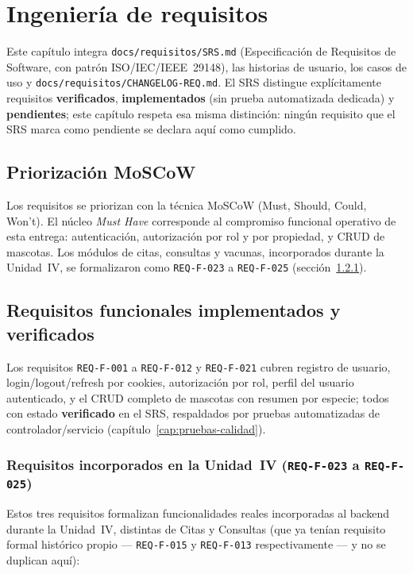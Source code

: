 \chapter{Ingenier\'ia de requisitos}
\label{cap:requisitos}

Este cap\'itulo integra \texttt{docs/requisitos/SRS.md} (Especificaci\'on
de Requisitos de Software, con patr\'on ISO/IEC/IEEE~29148), las historias
de usuario, los casos de uso y \texttt{docs/requisitos/CHANGELOG-REQ.md}.
El SRS distingue expl\'icitamente requisitos \textbf{verificados},
\textbf{implementados} (sin prueba automatizada dedicada) y
\textbf{pendientes}; este cap\'itulo respeta esa misma distinci\'on: ning\'un
requisito que el SRS marca como pendiente se declara aqu\'i como cumplido.

\section{Priorizaci\'on MoSCoW}

Los requisitos se priorizan con la t\'ecnica MoSCoW (Must, Should, Could,
Won't). El n\'ucleo \emph{Must Have} corresponde al compromiso funcional
operativo de esta entrega: autenticaci\'on, autorizaci\'on por rol y por
propiedad, y CRUD de mascotas. Los m\'odulos de citas, consultas y
vacunas, incorporados durante la Unidad~IV, se formalizaron como
\texttt{REQ-F-023} a \texttt{REQ-F-025} (secci\'on~\ref{sec:req-unidad4}).

\section{Requisitos funcionales implementados y verificados}

Los requisitos \texttt{REQ-F-001} a \texttt{REQ-F-012} y \texttt{REQ-F-021}
cubren registro de usuario, login/logout/refresh por cookies,
autorizaci\'on por rol, perfil del usuario autenticado, y el CRUD completo
de mascotas con resumen por especie; todos con estado \textbf{verificado}
en el SRS, respaldados por pruebas automatizadas de controlador/servicio
(cap\'itulo~\ref{cap:pruebas-calidad}).

\subsection{Requisitos incorporados en la Unidad~IV (\texttt{REQ-F-023} a \texttt{REQ-F-025})}
\label{sec:req-unidad4}

Estos tres requisitos formalizan funcionalidades reales incorporadas al
backend durante la Unidad~IV, distintas de Citas y Consultas (que ya
ten\'ian requisito formal hist\'orico propio --- \texttt{REQ-F-015} y
\texttt{REQ-F-013} respectivamente --- y no se duplican aqu\'i):

